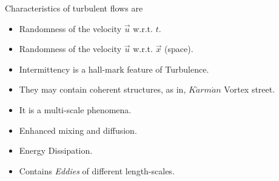 \documentclass{book}
\begin{document}
Characteristics of turbulent flows are \textemdash
\begin{itemize}
\item Randomness of the velocity $ \vec{u}$  w.r.t. $t$.
\item Randomness of the velocity $\vec{u}$ w.r.t. $\vec{x}$ (space).
\item Intermittency is a hall-mark feature of Turbulence.
\item They may contain coherent structures, as in, $K\acute{a}rm\acute{a}n$ Vortex street.
\item It is a multi-scale phenomena.
\item Enhanced mixing and diffusion.
\item Energy Dissipation.
\item Contains \textit{Eddies} of different length-scales.
\end{itemize}
\end{document}
